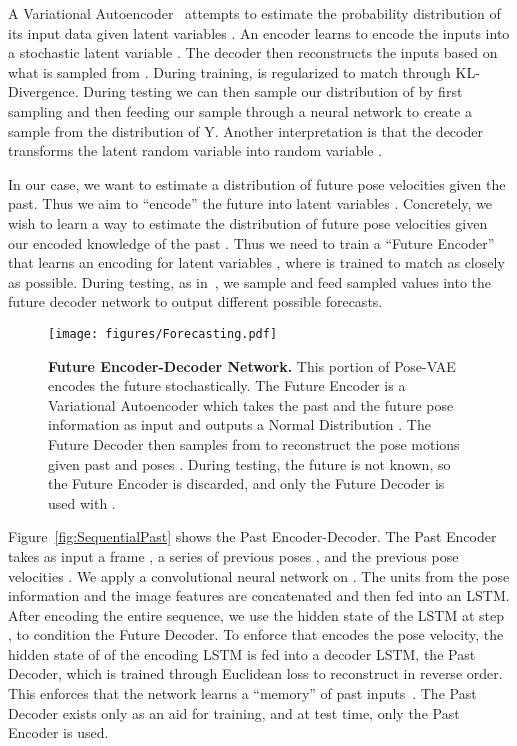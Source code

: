  A Variational Autoencoder~\cite{Kingma14a} attempts to estimate the probability distribution  of its input data  given latent variables . An encoder   learns to encode the inputs into a stochastic latent variable . The decoder  then reconstructs the inputs based on what is sampled from . During training,  is regularized to match  through KL-Divergence. During testing we can then sample our distribution of  by first sampling  and then feeding our sample through a neural network  to create a sample from the distribution of Y. Another interpretation is that the decoder  transforms the latent random variable  into random variable .

In our case, we want to estimate a distribution of future pose velocities given the past. Thus we aim to ``encode'' the future into latent variables . Concretely, we wish to learn a way to estimate the distribution  of future pose velocities  given our encoded knowledge of the past . Thus we need to train a ``Future Encoder'' that learns an encoding for latent variables , where  is trained to match  as closely as possible. 
During testing, as in~\cite{Walker16}, we sample  and feed sampled  values into the future decoder network to output different possible forecasts.

\begin{figure}
\centering
\texttt{[image: figures/Forecasting.pdf]} 
\caption{{\bf Future Encoder-Decoder Network.} This portion of Pose-VAE encodes the future stochastically. The Future Encoder is a Variational Autoencoder which takes the past  and the future pose information  as input and outputs a Normal Distribution . The Future Decoder then samples  from  to reconstruct the pose motions  given past  and poses . During testing, the future is not known, so the Future Encoder is discarded, and only the Future Decoder is used with . }
\label{fig:SequentialFuture}
\end{figure}

 Figure~\ref{fig:SequentialPast} shows the Past Encoder-Decoder. The Past Encoder takes as input a frame , a series of previous poses , and the previous pose velocities . We apply a convolutional neural network on . The units from the pose information and the image features are concatenated and then fed into an LSTM. After encoding the entire sequence, we use the hidden state of the LSTM at step ,  to condition the Future Decoder. To enforce that  encodes the pose velocity, the hidden state of of the encoding LSTM is fed into a decoder LSTM, the Past Decoder, which is trained through Euclidean loss to reconstruct  in reverse order. This enforces that the network learns a ``memory'' of past inputs~\cite{Srivastava15}. The Past Decoder exists only as an aid for training, and at test time, only the Past Encoder is used.

